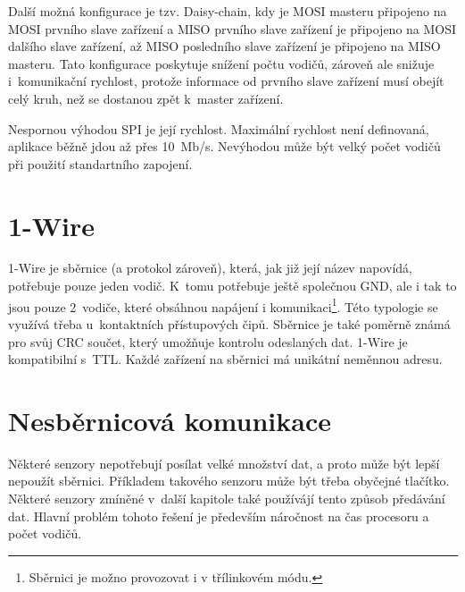 Další možná konfigurace je tzv. Daisy-chain, kdy je  MOSI masteru připojeno na MOSI prvního slave zařízení a MISO prvního slave zařízení je připojeno na MOSI dalšího slave zařízení, až MISO posledního slave zařízení je připojeno na MISO masteru.
Tato konfigurace poskytuje snížení počtu vodičů, zároveň ale snižuje i~komunikační rychlost, protože informace od prvního slave zařízení musí obejít celý kruh, než se dostanou zpět k~master zařízení.

Nespornou výhodou SPI je její rychlost.
Maximální rychlost není definovaná, aplikace běžně jdou až přes 10~Mb/s.
Nevýhodou může být velký počet vodičů při použití standartního zapojení.


\section{1-Wire}
1-Wire \cite{one-wire} je sběrnice (a protokol zároveň), která, jak již její název napovídá, potřebuje pouze jeden vodič.
K~tomu potřebuje ještě společnou GND, ale i tak to jsou pouze 2~vodiče, které obsáhnou napájení i komunikaci\footnote{Sběrnici je možno provozovat i v třílinkovém módu.}.
Této typologie se využívá třeba u~kontaktních přístupových čipů.
Sběrnice je také poměrně známá pro svůj CRC součet, který umožňuje kontrolu odeslaných dat.
1-Wire je kompatibilní s~TTL.
Každé zařízení na sběrnici má unikátní neměnnou adresu.


\section{Nesběrnicová komunikace}
Některé senzory nepotřebují posílat velké množství dat, a proto může být lepší nepoužít sběrnici. 
Příkladem takového senzoru může být třeba obyčejné tlačítko.
Některé senzory zmíněné v~další kapitole také používájí tento způsob předávání dat.
Hlavní problém tohoto řešení je především náročnost na čas procesoru a počet vodičů.

